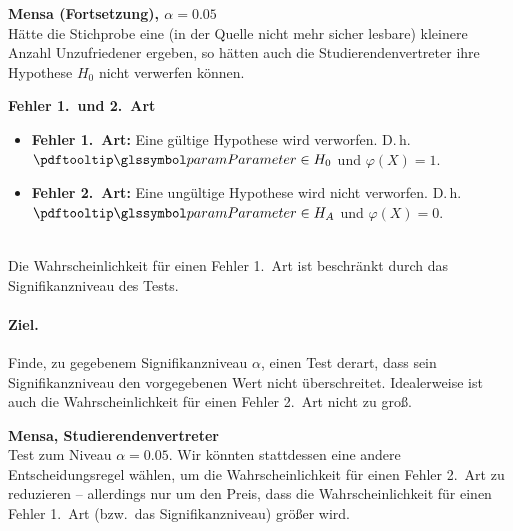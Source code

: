 \begin{bsp}
    \textbf{Mensa (Fortsetzung), $\alpha=0.05$}  \\
    Hätte die Stichprobe eine (in der Quelle nicht mehr sicher lesbare) kleinere Anzahl Unzufriedener ergeben, so
    hätten auch die Studierendenvertreter ihre Hypothese $H_0$ nicht verwerfen können.
\end{bsp}


\begin{defi}
    \textbf{Fehler 1.\ und 2.\ Art}  \\
    \begin{itemize}
        \item \textbf{Fehler 1.\ Art:} Eine gültige Hypothese wird verworfen.
        D.\,h.\ $\param \in H_0$ und
        $\varphi(X)=1$.
        \item \textbf{Fehler 2.\ Art:} Eine ungültige Hypothese wird nicht verworfen.
        D.\,h.\ $\param \in H_A$ und
        $\varphi(X)=0$.
    \end{itemize}
\end{defi}

\begin{bem}
     \\
    Die Wahrscheinlichkeit für einen Fehler 1.\ Art ist beschränkt durch das Signifikanzniveau des Tests.
\end{bem}

\paragraph{Ziel.} Finde, zu gegebenem Signifikanzniveau $\alpha$, einen Test derart, dass sein
Signifikanzniveau den vorgegebenen Wert nicht überschreitet.
Idealerweise ist auch die Wahrscheinlichkeit für einen
Fehler 2.\ Art nicht zu groß.

\begin{bsp}
    \textbf{Mensa, Studierendenvertreter}  \\
    Test zum Niveau $\alpha=0.05$.
    Wir könnten stattdessen eine andere Entscheidungsregel wählen, um die
    Wahrscheinlichkeit für einen Fehler 2.\ Art zu reduzieren -- allerdings nur um den Preis, dass die
    Wahrscheinlichkeit für einen Fehler 1.\ Art (bzw.\ das Signifikanzniveau) größer wird.
\end{bsp}

